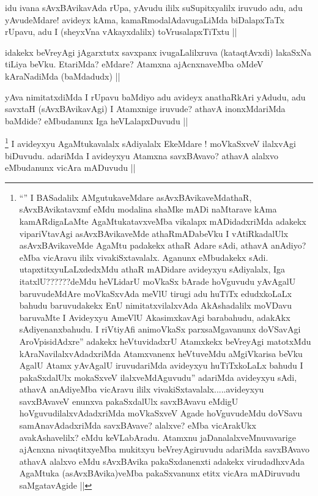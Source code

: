 
\begin{artha}
idu ivana sAvxBAvikavAda rUpa, yAvudu ililx suSupitxyalilx iruvudo adu, adu yAvudeMdare! avideyx kAma, kamaRmodalAdavugaLiMda biDalapxTaTx rUpavu, adu I (sheyxVna vAkayxdalilx) toVrusalapxTiTxtu ||
\end{artha}

\begin{artha}
idakekx beVreyAgi jAgarxtutx savxpanx ivugaLalilxruva (kataqtAvxdi) lakaSxNa tiLiya beVku. EtariMda? eMdare? Atamxna ajAcnxnaveMba oMdeV kAraNadiMda (baMdadudx) ||
\end{artha}


\begin{artha}
yAva nimitatxdiMda I rUpavu baMdiyo adu avideyx anathaRkAri yAdudu, adu savxtaH (sAvxBAvikavAgi) I Atamxnige iruvude? athavA inonxMdariMda baMdide? eMbudanunx Iga heVLalapxDuvudu ||
\end{artha}

\begin{artha}
\footnote{``\stext'' I BASadalilx AMgutukaveMdare asAvxBAvikaveMdathaR, sAvxBAvikatavxmf eMdu modalina shaMke mADi naMtarave kAma kamARdigaLaMte AgaMtukatavxveMba vikalapx mADidadxriMda adakekx vipariVtavAgi asAvxBAvikaveMde athaRmADabeVku I vAtiRkadalUlx asAvxBAvikaveMde AgaMtu padakekx athaR Adare sAdi, athavA anAdiyo? eMba vicAravu ililx vivakiSxtavalalx. Aganunx eMbudakekx sAdi. utapxtitxyuLaLxdedxMdu athaR mADidare avideyxyu sAdiyalalx, Iga itatxlU??????deMdu heVLidarU moVkaSx bArade hoVguvudu yAvAgalU baruvudeMdAre moVkaSxvAda meVlU tirugi adu huTiTx edudxkoLaLx bahudu baruvudakekx EnU nimitatxvilalxvAda AkAshadalilx moVDavu baruvaMte I Avideyxyu AmeVlU AkasimxkavAgi barabahudu, adakAkx sAdiyenanxbahudu. I riVtiyAfi animoVkaSx parxsaMgavanunx doVSavAgi AroVpisidAdxre'' adakekx heVtuvidadxrU Atamxkekx beVreyAgi matotxMdu kAraNavilalxvAdadxriMda Atamxvanenx heVtuveMdu aMgiVkarisa beVku AgalU Atamx yAvAgalU iruvudariMda avideyxyu huTiTxkoLaLx bahudu I pakaSxdalUlx mokaSxveV ilalxveMdAguvudu'' adariMda avideyxyu sAdi, athavA anAdiyeMba vicAravu ililx vivakiSxtavalalx.....avideyxyu savxBAvaveV enunxva pakaSxdalUlx savxBAvavu eMdigU hoVguvudilalxvAdadxriMda moVkaSxveV Agade hoVguvudeMdu doVSavu samAnavAdadxriMda savxBAvave? alalxve? eMba vicArakUkx avakAshavelilx? eMdu keVLabAradu. Atamxnu jaDanalalxveMnuvavarige ajAcnxna nivaqtitxyeMba mukitxyu beVreyAgiruvudu adariMda savxBAvavo athavA alalxvo eMdu sAvxBAvika pakaSxdanenxti adakekx virudadhxvAda AgaMtuka (asAvxBAvika)veMba pakaSxvanunx etitx vicAra mADiruvudu saMgatavAgide ||} 
I avideyxyu AgaMtukavalalx sAdiyalalx EkeMdare ! moVkaSxveV ilalxvAgi biDuvudu. adariMda I avideyxyu Atamxna savxBAvavo? athavA alalxvo eMbudanunx vicAra mADuvudu ||
\end{artha}

